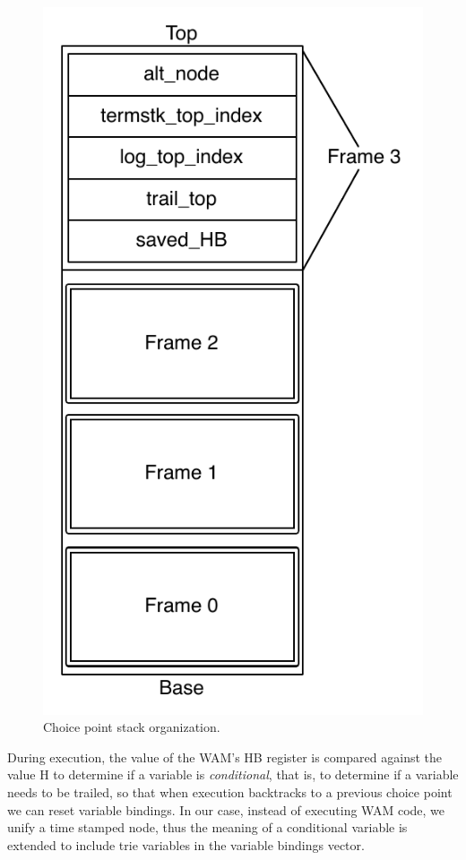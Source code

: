 \begin{figure}[H]
  \centering
    \includegraphics[scale=0.45]{choice_point_stack.pdf}
  \caption{Choice point stack organization.}
  \label{fig:choice_point_stack}
\end{figure}

During execution, the value of the WAM's HB register is compared against the value H to determine if a variable is \textit{conditional}, that is, to determine if a variable needs to be trailed, so that when execution backtracks to a previous choice point we can reset variable bindings. In our case, instead of executing WAM code, we unify a time stamped node, thus the meaning of a conditional variable is extended to include trie variables in the variable bindings vector.

